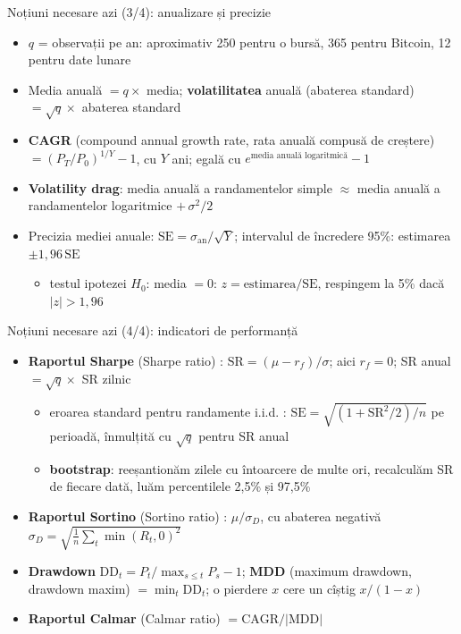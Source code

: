 \begin{frame}{Noțiuni necesare azi (3/4): anualizare și precizie}
\itemsize{\footnotesize}
\begin{itemize}
    \item $q$ = observații pe an: aproximativ 250 pentru o bursă, 365 pentru Bitcoin, 12 pentru date lunare
    \item Media anuală $= q \times$ media; \textbf{volatilitatea} anuală (abaterea standard) $= \sqrt{q} \times$ abaterea standard
    \item \textbf{CAGR} (compound annual growth rate, rata anuală compusă de creștere) $= (P_T/P_0)^{1/Y} - 1$, cu $Y$ ani; egală cu $e^{\text{media anuală logaritmică}} - 1$
    \item \textbf{Volatility drag}: media anuală a randamentelor simple $\approx$ media anuală a randamentelor logaritmice $+\, \sigma^2/2$
    \item Precizia mediei anuale: $\text{SE} = \sigma_{\text{an}}/\sqrt{Y}$; intervalul de încredere 95\%: estimarea $\pm 1{,}96\,\text{SE}$
    \begin{itemize}
        \item testul ipotezei $H_0$: media $= 0$: $z = \text{estimarea}/\text{SE}$, respingem la 5\% dacă $|z| > 1{,}96$
    \end{itemize}
\end{itemize}
\end{frame}

\begin{frame}{Noțiuni necesare azi (4/4): indicatori de performanță}
\itemsize{\footnotesize}
\begin{itemize}
    \item \textbf{Raportul Sharpe} (Sharpe ratio) : $\text{SR} = (\mu - r_f)/\sigma$; aici $r_f = 0$; SR anual $= \sqrt{q} \times$ SR zilnic
    \begin{itemize}
        \item eroarea standard pentru randamente i.i.d. : $\text{SE} = \sqrt{(1 + \text{SR}^2/2)/n}$ pe perioadă, înmulțită cu $\sqrt{q}$ pentru SR anual
        \item \textbf{bootstrap}: reeșantionăm zilele cu întoarcere de multe ori, recalculăm SR de fiecare dată, luăm percentilele 2,5\% și 97,5\%
    \end{itemize}
    \item \textbf{Raportul Sortino} (Sortino ratio) : $\mu/\sigma_D$, cu abaterea negativă $\sigma_D = \sqrt{\frac1n\sum_t \min(R_t, 0)^2}$
    \item \textbf{Drawdown} $\text{DD}_t = P_t/\max_{s \le t} P_s - 1$; \textbf{MDD} (maximum drawdown, drawdown maxim) $= \min_t \text{DD}_t$; o pierdere $x$ cere un cîștig $x/(1-x)$
    \item \textbf{Raportul Calmar} (Calmar ratio) $= \text{CAGR}/|\text{MDD}|$
\end{itemize}
\end{frame}


